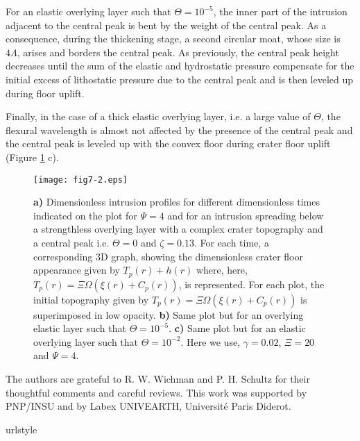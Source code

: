 \begin{article}
\begin{enumerate}
For an elastic overlying layer such that $\Theta=10^{-5}$, the inner part of the intrusion adjacent to the central peak is bent by the weight of the central peak. As a consequence, during the thickening stage, a second circular moat, whose size is $4\Lambda$, arises and borders the central peak. As previously, the central peak height decreases until the sum of the elastic and hydrostatic pressure compensate for the initial excess of lithostatic pressure due to the central peak and is then leveled up during floor uplift.

Finally, in the case of a thick elastic overlying layer, i.e. a large value of $\Theta$, the flexural wavelength is almost not affected by the presence of the central peak and the central peak is leveled up with the convex floor during crater floor uplift (Figure \ref{fig7-2} c).


\begin{figure}[h!]
\begin{center}
\graphicspath{{/Users/thorey/Documents/These/Submission/Article/FFC_JGR_2013/Paper_APRES_2nd_REVIEW/ }}
 \texttt{[image: fig7-2.eps]}
 \caption{ \textbf{a)} Dimensionless intrusion profiles for different dimensionless times indicated on the plot for $\Psi=4$ and for an intrusion spreading below a strengthless overlying layer with a complex crater topography and a central peak i.e. $\Theta=0$ and  $\zeta=0.13$. For each time, a corresponding 3D graph, showing the dimensionless crater floor appearance given by $T_p(r)+h(r)$ where, here, $T_p(r)=\Xi \Omega(\xi(r)+C_p(r))$, is represented. For each plot, the initial topography given by $T_p(r)=\Xi \Omega(\xi(r)+C_p(r))$ is superimposed in low opacity. \textbf{b)} Same plot but for an overlying elastic layer such that $\Theta=10^{-5}$. \textbf{c)} Same plot but for an elastic overlying layer such that $\Theta=10^{-2}$. Here we use, $\gamma=0.02$, $\Xi=20$ and $\Psi=4$.}
\label{fig7-2}
\end{center}
\end{figure}

\newpage

%

\begin{acknowledgments}
	The authors are grateful to R. W. Wichman and P. H. Schultz for their thoughtful comments and careful reviews. This work was supported by PNP/INSU and by Labex UNIVEARTH, Universit\'e Paris Diderot.
\end{acknowledgments}


\begin{thebibliography}{39}
\providecommand{\natexlab}[1]{#1}
\expandafter\ifx\csname urlstyle\endcsname\relax
  \providecommand{\doi}[1]{doi:\discretionary{}{}{}#1}\else
  \providecommand{\doi}{doi:\discretionary{}{}{}\begingroup
  \urlstyle{rm}\Url}\fi


\end{thebibliography}
\end{enumerate}
\end{article}
